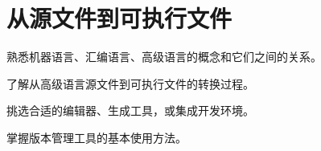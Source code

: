 
\chapter{从源文件到可执行文件}

\begin{introduction}
	\item 熟悉机器语言、汇编语言、高级语言的概念和它们之间的关系。
	\item 了解从高级语言源文件到可执行文件的转换过程。
	\item 挑选合适的编辑器、生成工具，或集成开发环境。
	\item 掌握版本管理工具的基本使用方法。
\end{introduction}
